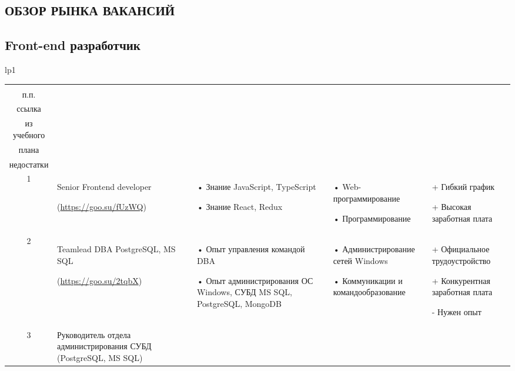 \documentclass[14pt]{extreport}
\begin{document}
\begin{landscape}
\chapter{ОБЗОР РЫНКА ВАКАНСИЙ\label{chapter2}}

\section{Front-end разработчик}


\begin{longtable}[H]{lp{1\linewidth}}
\caption{Администратор баз данных \label{table1}}


\centering

\begin{small}


    \begin{tabular}{|c|p{}|p{6cm}|p{5cm}|p{5cm}|}
	\hline 
	\makecell{№ \\ п.п.} &	\makecell{Название должности,\\ ссылка} &	\makecell{Требования} & 	\makecell{Дисциплины \\ из учебного \\плана} &	\makecell{Преимущества и \\недостатки}  \\ 
	\hline 
	1	& Senior Frontend developer

(\url{https://goo.su/fUzWQ})
& •	Знание JavaScript, TypeScript

•	Знание React, Redux

 &	•	Web-программирование
 
•	Программирование
 & + Гибкий график

+ Высокая заработная плата

 \\
	\hline
	2 & Teamlead DBA PostgreSQL, MS SQL
	
(\url{https://goo.su/2tqbX})
& •	Опыт управления командой DBA 

•	Опыт администрирования ОС Windows, СУБД MS SQL, PostgreSQL, MongoDB
&
•	Администрирование сетей Windows

•	Коммуникации и командообразование
&+	Официальное трудоустройство 

+	Конкурентная заработная плата

-	Нужен опыт\\


	\hline
	3 & Руководитель отдела администрирования СУБД (PostgreSQL, MS SQL)
	

\end{tabular}
\end{small}
\end{longtable}
\end{landscape}
\end{document}
